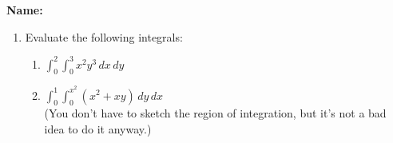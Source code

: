 \documentclass[12pt]{article}
\newcommand{\di}{\displaystyle}
\begin{document}
{\bf \Large Name:}
\thispagestyle{fancy}

 \begin{enumerate}
 \item Evaluate the following integrals:
\begin{enumerate}
 \item $\di \int_0^2\int_0^3x^2y^3\,dx\,dy$

\vspace{3in}
 
 \item $\di \int_0^1\int_0^{x^2}(x^2+xy)\,dy\,dx$\\
(You don't have to sketch the region of integration, but it's not a bad idea to do it anyway.)
 
\end{enumerate}





 \end{enumerate}
\end{document}
